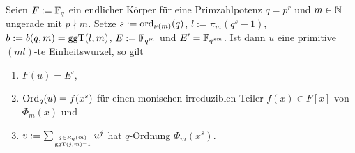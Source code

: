 \begin{satz}
  \label{satz:konstruktion_q_ordnung_reg}
  Seien $F := \mathbb{F}_q$ ein endlicher Körper für eine Primzahlpotenz $q = p^r$ 
  und $m\in\mathbb{N}$ ungerade mit $p\nmid m$.
  Setze $s := \operatorname{ord}_{\nu(m)}(q)$, 
  $l := \pi_m(q^s-1)$, $b:= b(q,m) = \operatorname{ggT}(l,m)$, $E := \mathbb{F}_{q^m}$ und
  $E' = \mathbb{F}_{q^{sm}}$. Ist dann
  $u$ eine primitive $(ml)$-te Einheitswurzel, so gilt
  \begin{enumerate}
    \item $F(u) = E'$,
    \item $\operatorname{Ord}_q(u) = f(x^s)$ für einen monischen irreduziblen Teiler 
      $f(x) \in F[x]$ von $\Phi_m(x)$ und 
    \item $v := \sum_{j \in R_q(m)\atop \operatorname{ggT}(j,m)=1} 
      u^j$ hat $q$-Ordnung $\Phi_m(x^s)$.
  \end{enumerate}
\end{satz}
